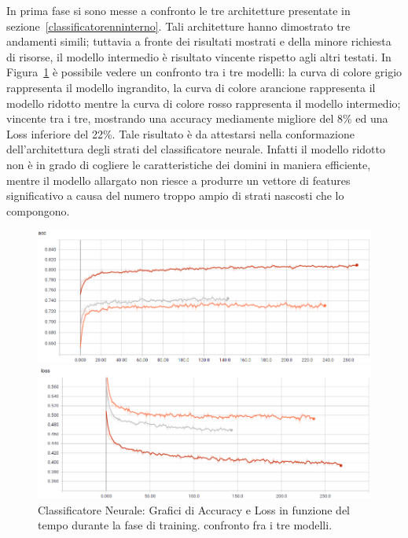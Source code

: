 In prima fase si sono messe a confronto le tre architetture presentate in sezione~\ref{classificatorenninterno}. Tali architetture hanno dimostrato tre andamenti simili; tuttavia a fronte dei risultati mostrati e della minore richiesta di risorse, il modello intermedio è risultato vincente rispetto agli altri testati. In Figura~\ref{fig:cfrmlp} è possibile vedere un confronto tra i tre modelli: la curva di colore grigio rappresenta il modello ingrandito, la curva di colore arancione rappresenta il modello ridotto mentre la curva di colore rosso rappresenta il modello intermedio; vincente tra i tre, mostrando una accuracy mediamente migliore del 8\% ed una Loss inferiore del 22\%. Tale risultato è da attestarsi nella conformazione dell'architettura degli strati del classificatore neurale. Infatti il modello ridotto non è in grado di cogliere le caratteristiche dei domini in maniera efficiente, mentre il modello allargato non riesce a produrre un vettore di features significativo a causa del numero troppo ampio di strati nascosti che lo compongono.

\begin{figure}[!bp] 
\centering
	\begin{minipage}[t]{\linewidth}
		\includegraphics[width=\linewidth]{figures/MLP1.png}
	\end{minipage}\hfill
	\vspace{3cm}
	\begin{minipage}[b]{\linewidth}
		\includegraphics[width=\linewidth]{figures/MLP2.png}
	\end{minipage}
	\caption{Classificatore Neurale: Grafici di Accuracy e Loss in funzione del tempo durante la fase di training. confronto fra i tre modelli. \label{fig:cfrmlp}}
\end{figure}

